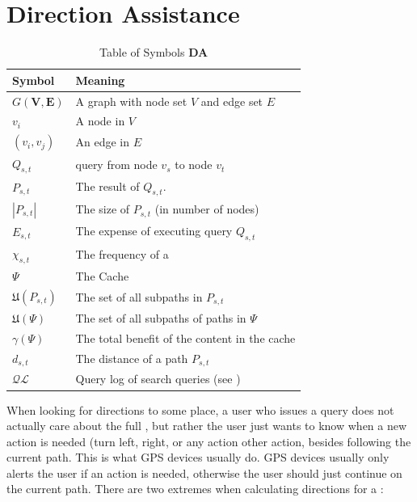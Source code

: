 \section{Direction Assistance}


\begin{table}
\begin{tabular*}{\columnwidth}{|l|p{}|}
\hline
\bf Symbol		& \bf Meaning \\\hline
$G\mathbf{(V,E)}$ 	& A graph with node set $V$ and edge set $E$ \\\hline 
$v_i$			& A node in $V$ \\\hline 
$(v_i,v_j)$		& An edge in $E$ \\\hline 

$Q_{s,t}$		& \spath query from node $v_s$ to node $v_t$\\\hline
$P_{s,t}$		& The \spath result of $Q_{s,t}$. \\\hline
$|P_{s,t}|$		& The size of $P_{s,t}$ (in number of nodes) \\\hline
$E_{s,t}$		& The expense of executing query $Q_{s,t}$ \\\hline
$\chi_{s,t}$		& The frequency of a \spath \\\hline
$\Psi$ 			& The Cache \\\hline
$\mathfrak{U}(P_{s,t})$& The set of all subpaths in $P_{s,t}$ \\\hline
$\mathfrak{U}(\Psi)$	& The set of all subpaths of paths in $\Psi$ \\\hline
$\gamma(\Psi)$	& The total benefit of the content in the cache \\\hline

$d_{s,t}$		& The \spath distance of a path $P_{s,t}$ \\\hline

$\mathcal{QL}$		& Query log of search queries (see \cite{thomsen2012}) \\\hline
\end{tabular*}
\caption{Table of Symbols \textbf{DA}}
\label{tab:symbols}
\end{table}

When looking for directions to some place, a user who issues a \spath query does not actually care about the full \spathns\cite{sigmodTaoSP11}, but rather the user just wants to know when a new action is needed (turn left, right, or any action other action, besides following the current path. This is what GPS devices usually do. GPS devices usually only alerts the user if an action is needed, otherwise the user should just continue on the current path.
There are two extremes when calculating directions for a \spathns:

